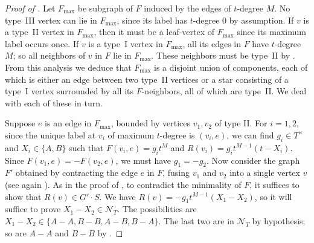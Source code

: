 \documentclass[reqno]{amsart}
\theoremstyle{definition}
\theoremstyle{remark}
\newcommand{\Nc}{\mathcal{N}}
\begin{document}
\begin{proof}[Proof of ]
Let $F_{\max}$ be subgraph of $F$ induced by the edges of $t$-degree $M$. 
No type~III vertex can lie in $F_{\max}$, since its label has $t$-degree 0 by assumption. If $v$ is a type~II vertex in $F_{\max}$, then it must be a leaf-vertex of $F_{\max}$ since its maximum label occurs once. 
If $v$ is a type~I vertex in $F_{\max}$, all its edges in $F$ have $t$-degree $M$; so all neighbors of $v$ in $F$ lie in $F_{\max}$. These neighbors must be type~II by .
From this analysis we deduce that $F_{\max}$ is a disjoint union of components, each of which is either an edge between two type~II vertices or a star consisting of a type~I vertex surrounded by all its $F$-neighbors, all of which are type~II. We deal with each of these in turn.

Suppose $e$ is an edge in $F_{\max}$, bounded by vertices $v_1, v_2$ of type II. For $i = 1,2$, since the unique label at $v_i$ of maximum $t$-degree is $(v_i, e)$, we can find $g_i \in T^{\times}$ and $X_i \in \{A, B\}$ such that $F(v_i, e) = g_i t^M$ and
$R(v_i) = g_i t^{M-1}(t - X_i)$.
Since
$F(v_1, e) = - F(v_2, e)$, we must have $g_1 = - g_2$.
Now consider the graph $F'$ obtained by contracting the edge $e$ in $F$, fusing $v_1$ and $v_2$ into a single vertex $v$ (see again ).
As in the proof of , to contradict the minimality of $F$, it suffices to show that $R(v) \in G' \cdot S$.
We have $R(v) = -g_1 t^{M-1}(X_1 - X_2)$,
so it will suffice to prove $X_1 - X_2 \in \Nc_T$.
The possibilities are $X_1 - X_2 \in \{A - A, B - B, A - B, B - A\}$. The last two are in $\Nc_T$ by hypothesis; so are $A-A$ and $B-B$ by .


\end{proof}
\end{document}
